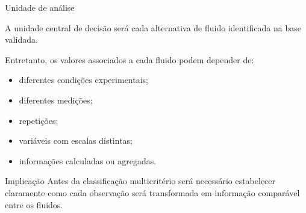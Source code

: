 
\begin{frame}{Unidade de análise}

    A unidade central de decisão será cada alternativa de fluido
    identificada na base validada.

    \vspace{0.3cm}

    Entretanto, os valores associados a cada fluido podem depender de:

    \begin{itemize}
        \item diferentes condições experimentais;
        \item diferentes medições;
        \item repetições;
        \item variáveis com escalas distintas;
        \item informações calculadas ou agregadas.
    \end{itemize}

    \vspace{0.3cm}

    \begin{block}{Implicação}
        Antes da classificação multicritério será necessário estabelecer
        claramente como cada observação será transformada em informação
        comparável entre os fluidos.
    \end{block}

\end{frame}



